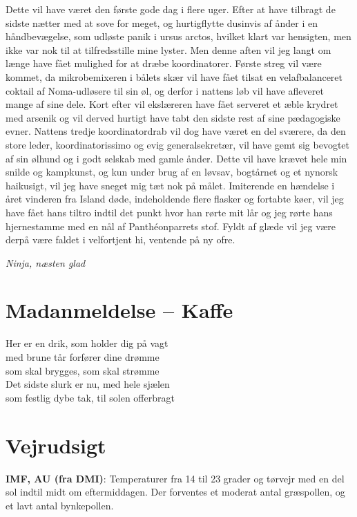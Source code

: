 \begin{minipage}[b]{0.95\linewidth}
\begin{minipage}[t]{0.47\textwidth}
Dette vil have været den første gode dag i flere uger. Efter at have tilbragt de sidste nætter med at sove for meget, og hurtigflytte dusinvis af ånder i en håndbevægelse, som udløste panik i ursus arctos, hvilket klart var hensigten, men ikke var nok til at tilfredsstille mine lyster. Men denne aften vil jeg langt om længe have fået mulighed for at dræbe koordinatorer. Første streg vil være kommet, da mikrobemixeren i bålets skær vil have fået tilsat en velafbalanceret coktail af Noma-udløsere til sin øl, og derfor i nattens løb vil have afleveret mange af sine dele. Kort efter vil ekslæreren have fået serveret et æble krydret med arsenik og vil derved hurtigt have tabt den sidste rest af sine pædagogiske evner. Nattens tredje koordinatordrab vil dog have været en del sværere, da den store leder, koordinatorissimo og evig generalsekretær, vil have gemt sig bevogtet af sin ølhund og i godt selskab med gamle ånder. Dette vil have krævet hele min snilde og kampkunst, og kun under brug af en løvsav, bogtårnet og et nynorsk haikusigt, vil jeg have sneget mig tæt nok på målet. Imiterende en hændelse i året vinderen fra Island døde, indeholdende flere flasker og fortabte køer, vil jeg have fået hans tiltro indtil det punkt hvor han rørte mit lår og jeg rørte hans hjernestamme med en nål af Panthéonparrets stof. Fyldt af glæde vil jeg være derpå være faldet i velfortjent hi, ventende på ny ofre.

{\flushright\emph{Ninja, næsten glad}}

\vspace{-3mm}
\section*{Madanmeldelse -- Kaffe}

Her er en drik, som holder dig på vagt \\
med brune tår forfører dine drømme \\
som skal brygges, som skal strømme \\
Det sidste slurk er nu, med hele sjælen \\
som festlig dybe tak, til solen offerbragt

\end{minipage}%
\hfill\begin{minipage}[t]{0.47\textwidth}
\vspace{2mm}
\section*{Vejrudsigt}
\textbf{IMF, AU (fra DMI)}: Temperaturer fra 14 til 23 grader og tørvejr med en del sol indtil midt om eftermiddagen. Der forventes et moderat antal græspollen, og et lavt antal bynkepollen.


\end{minipage}
\end{minipage}
